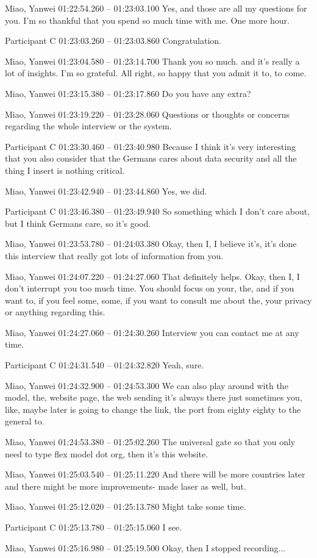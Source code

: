 {Miao, Yanwei 01:22:54.260 -- 01:23:03.100
Yes, and those are all my questions for you. I'm so thankful that you spend so much time with me. One more hour.

Participant C 01:23:03.260 -- 01:23:03.860
Congratulation.

Miao, Yanwei 01:23:04.580 -- 01:23:14.700
Thank you so much. and it's really a lot of insights. I'm so grateful. All right, so happy that you admit it to, to come.

Miao, Yanwei 01:23:15.380 -- 01:23:17.860
Do you have any extra?

Miao, Yanwei 01:23:19.220 -- 01:23:28.060
Questions or thoughts or concerns regarding the whole interview or the system.

Participant C 01:23:30.460 -- 01:23:40.980
Because I think it's very interesting that you also consider that the Germans cares about data security and all the thing I insert is nothing critical.

Miao, Yanwei 01:23:42.940 -- 01:23:44.860
Yes, we did.

Participant C 01:23:46.380 -- 01:23:49.940
So something which I don't care about, but I think Germans care, so it's good.

Miao, Yanwei 01:23:53.780 -- 01:24:03.380
Okay, then I, I believe it's, it's done this interview that really got lots of information from you.

Miao, Yanwei 01:24:07.220 -- 01:24:27.060
That definitely helps. Okay, then I, I don't interrupt you too much time. You should focus on your, the, and if you want to, if you feel some, some, if you want to consult me about the, your privacy or anything regarding this.

Miao, Yanwei 01:24:27.060 -- 01:24:30.260
Interview you can contact me at any time.

Participant C 01:24:31.540 -- 01:24:32.820
Yeah, sure.

Miao, Yanwei 01:24:32.900 -- 01:24:53.300
We can also play around with the model, the, website page, the web sending it's always there just sometimes you, like, maybe later is going to change the link, the port from eighty eighty to the general to.

Miao, Yanwei 01:24:53.380 -- 01:25:02.260
The universal gate so that you only need to type flex model dot org, then it's this website.

Miao, Yanwei 01:25:03.540 -- 01:25:11.220
And there will be more countries later and there might be more improvements- made laser as well, but.

Miao, Yanwei 01:25:12.020 -- 01:25:13.780
Might take some time.

Participant C 01:25:13.780 -- 01:25:15.060
I see.

Miao, Yanwei 01:25:16.980 -- 01:25:19.500
Okay, then I stopped recording...
}